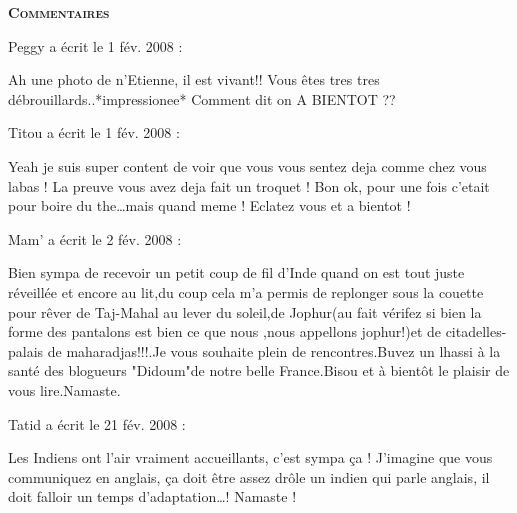 \bigskip
\textbf{\textsc{Commentaires}}

\medskip
Peggy a écrit le 1 fév. 2008 :
\begin{displayquote}
Ah une photo de n'Etienne, il est vivant!!
Vous êtes tres tres débrouillards..*impressionee*
Comment dit on A BIENTOT ??
\end{displayquote}

\medskip
Titou a écrit le 1 fév. 2008 :
\begin{displayquote}
Yeah je suis super content de voir que vous vous sentez deja comme chez vous labas ! La preuve vous avez deja fait un troquet ! Bon ok, pour une fois c'etait pour boire du the\dots mais quand meme ! Eclatez vous et a bientot !
\end{displayquote}

\medskip
Mam' a écrit le 2 fév. 2008 :
\begin{displayquote}
Bien sympa de recevoir un petit coup de fil d'Inde quand on est tout juste réveillée et encore au lit,du coup cela m'a permis de replonger sous la couette pour rêver de Taj-Mahal au lever du soleil,de Jophur(au fait vérifez si bien la forme des pantalons est bien ce que nous ,nous appellons jophur!)et de citadelles-palais de maharadjas!!!.Je vous souhaite plein de rencontres.Buvez un lhassi
à la santé des blogueurs "Didoum"de notre belle France.Bisou et à bientôt le plaisir de vous lire.Namaste.
\end{displayquote}

\medskip
Tatid a écrit le 21 fév. 2008 :
\begin{displayquote}
Les Indiens ont l'air vraiment accueillants, c'est sympa ça ! J'imagine que vous communiquez en anglais, ça doit être assez drôle un indien qui parle anglais, il doit falloir un temps d'adaptation\dots !
Namaste !
\end{displayquote}

\vfill
